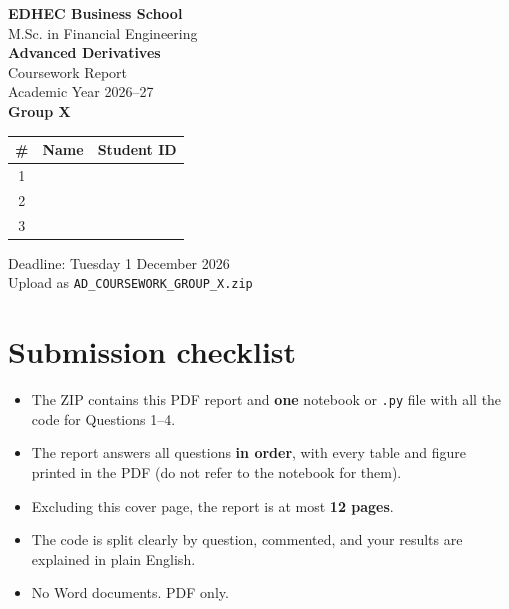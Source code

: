 \documentclass[12pt,a4paper]{article}
\begin{document}
\begin{titlepage}
\centering
\vspace*{1.5cm}

{\Large\bfseries EDHEC Business School}\\[3mm]
{\large M.Sc. in Financial Engineering}\\[18mm]

{\LARGE\bfseries Advanced Derivatives}\\[5mm]
{\LARGE Coursework Report}\\[6mm]
{\Large Academic Year 2026--27}\\[18mm]

{\Large\bfseries Group X}\\[10mm]

\begin{tabular}{@{}cll@{}}
\toprule
\# & Name & Student ID\\
\midrule
1 & \hspace{7cm} & \hspace{3cm}\\
2 & \hspace{7cm} & \hspace{3cm}\\
3 & \hspace{7cm} & \hspace{3cm}\\
\bottomrule
\end{tabular}

\vfill
{\large Deadline: Tuesday 1 December 2026}\\[3mm]
{\normalsize Upload as \texttt{AD\_COURSEWORK\_GROUP\_X.zip}}
\vspace*{1.5cm}
\end{titlepage}

\section*{Submission checklist}
\begin{center}
\begin{itemize}[leftmargin=*,itemsep=2pt]
  \item The ZIP contains this PDF report and \textbf{one} notebook or
        \texttt{.py} file with all the code for Questions 1--4.
  \item The report answers all questions \textbf{in order}, with every table
        and figure printed in the PDF (do not refer to the notebook for them).
  \item Excluding this cover page, the report is at most \textbf{12 pages}.
  \item The code is split clearly by question, commented, and your results are
        explained in plain English.
  \item No Word documents. PDF only.
\end{itemize}
\end{center}
\end{document}
